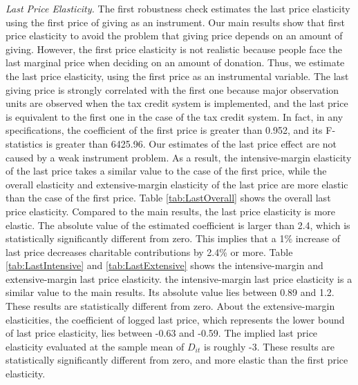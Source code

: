 \documentclass[
  11pt,
  a4paper,
]{article}
\begin{document}
\emph{Last Price Elasticity.}
The first robustness check estimates the last price elasticity using the first price of giving as an instrument.
Our main results show that first price elasticity to avoid the problem that giving price depends on an amount of giving.
However, the first price elasticity is not realistic because people face the last marginal price when deciding on an amount of donation.
Thus, we estimate the last price elasticity, using the first price as an instrumental variable.
The last giving price is strongly correlated with the first one because
major observation units are observed when the tax credit system is implemented,
and the last price is equivalent to the first one in the case of the tax credit system.
In fact, in any specifications, the coefficient of the first price is greater than 0.952,
and its F-statistics is greater than 6425.96.
Our estimates of the last price effect are not caused by a weak instrument problem.
As a result, the intensive-margin elasticity of the last price takes a similar value to the case of the first price, while
the overall elasticity and extensive-margin elasticity of the last price are more elastic than the case of the first price.
Table \ref{tab:LastOverall} shows the overall last price elasticity.
Compared to the main results, the last price elasticity is more elastic.
The absolute value of the estimated coefficient is larger than 2.4,
which is statistically significantly different from zero.
This implies that a 1\% increase of last price decreases charitable contributions by 2.4\% or more.
Table \ref{tab:LastIntensive} and \ref{tab:LastExtensive} shows
the intensive-margin and extensive-margin last price elasticity.
the intensive-margin last price elasticity is a similar value to the main results.
Its absolute value lies between 0.89 and 1.2.
These results are statistically different from zero.
About the extensive-margin elasticities,
the coefficient of logged last price, which represents the lower bound of last price elasticity,
lies between -0.63 and -0.59.
The implied last price elasticity evaluated at the sample mean of \(D_{it}\) is roughly -3.
These results are statistically significantly different from zero, and more elastic than the first price elasticity.
\end{document}

